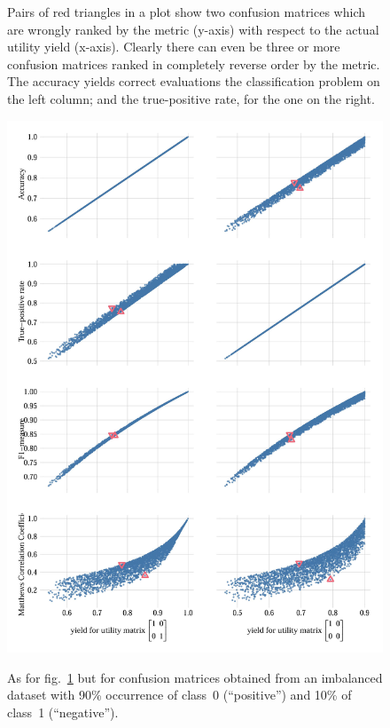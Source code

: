 \documentclass[\ifafour a4paper,12pt,\else a5paper,10pt,\fi%
onecolumn,oneside,article,%
british%
]{memoir}
\theoremstyle{remark}
\theoremstyle{innote}
\renewcommand*{\|}[1][]{\nonscript\:#1\vert\nonscript\:\mathopen{}}
\newcommand*{\fig}{fig.}%
\begin{document}
\begin{figure}[p]
{%
  Pairs of {\color{myred}red triangles} in a plot show two confusion matrices which are wrongly ranked by the metric (y-axis) with respect to the actual utility yield (x-axis). Clearly there can even be three or more confusion matrices ranked in completely reverse order by the metric.
%
  The accuracy yields correct evaluations the classification problem on the left column; and the true-positive rate, for the one on the right. }
  \label{fig:metrics_vs_utility}
\end{figure}
\begin{figure}[p]
  \centering
\includegraphics[width=0.95\linewidth]{utility_vs_metrics2_0.9.jpg}\\%
\caption{As for \fig~\ref{fig:metrics_vs_utility} but for confusion matrices obtained from an imbalanced dataset with 90\% occurrence of class~0 (\enquote{positive}) and 10\% of class~1 (\enquote{negative}).}
  \label{fig:metrics_vs_utility2}
\end{figure}
\end{document}
